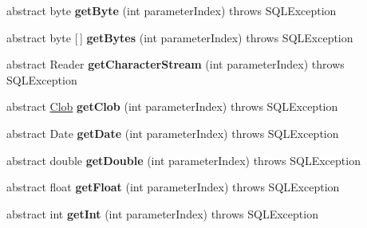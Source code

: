 \begin{DoxyCompactItemize}
abstract byte {\bfseries get\+Byte} (int parameter\+Index)  throws S\+Q\+L\+Exception
\item 
\mbox{\label{interfacecom_1_1mysql_1_1jdbc_1_1_parameter_bindings_a5a784b6c044a45401e3b5548284220fe}} 
abstract byte \mbox{[}$\,$\mbox{]} {\bfseries get\+Bytes} (int parameter\+Index)  throws S\+Q\+L\+Exception
\item 
\mbox{\label{interfacecom_1_1mysql_1_1jdbc_1_1_parameter_bindings_ab5836e85353a352892a0d7496e20beb7}} 
abstract Reader {\bfseries get\+Character\+Stream} (int parameter\+Index)  throws S\+Q\+L\+Exception
\item 
\mbox{\label{interfacecom_1_1mysql_1_1jdbc_1_1_parameter_bindings_a396aea0b205807ac5074f1824584b75a}} 
abstract \mbox{\hyperlink{classcom_1_1mysql_1_1jdbc_1_1_clob}{Clob}} {\bfseries get\+Clob} (int parameter\+Index)  throws S\+Q\+L\+Exception
\item 
\mbox{\label{interfacecom_1_1mysql_1_1jdbc_1_1_parameter_bindings_a502eeb48faa83966aa6d0827c5a2eaca}} 
abstract Date {\bfseries get\+Date} (int parameter\+Index)  throws S\+Q\+L\+Exception
\item 
\mbox{\label{interfacecom_1_1mysql_1_1jdbc_1_1_parameter_bindings_a12acb2612b7ba4ea3282bdb4fee13abf}} 
abstract double {\bfseries get\+Double} (int parameter\+Index)  throws S\+Q\+L\+Exception
\item 
\mbox{\label{interfacecom_1_1mysql_1_1jdbc_1_1_parameter_bindings_aae022aec0674de28b26940eb9e3f47a4}} 
abstract float {\bfseries get\+Float} (int parameter\+Index)  throws S\+Q\+L\+Exception
\item 
\mbox{\label{interfacecom_1_1mysql_1_1jdbc_1_1_parameter_bindings_a67311a3c03bbd40e09ed9c39091a7768}} 
abstract int {\bfseries get\+Int} (int parameter\+Index)  throws S\+Q\+L\+Exception
\item 
\mbox{\label{interfacecom_1_1mysql_1_1jdbc_1_1_parameter_bindings_a57d2dd1aabaab62f1d04dce67a331cc0}} 

\end{DoxyCompactItemize}

